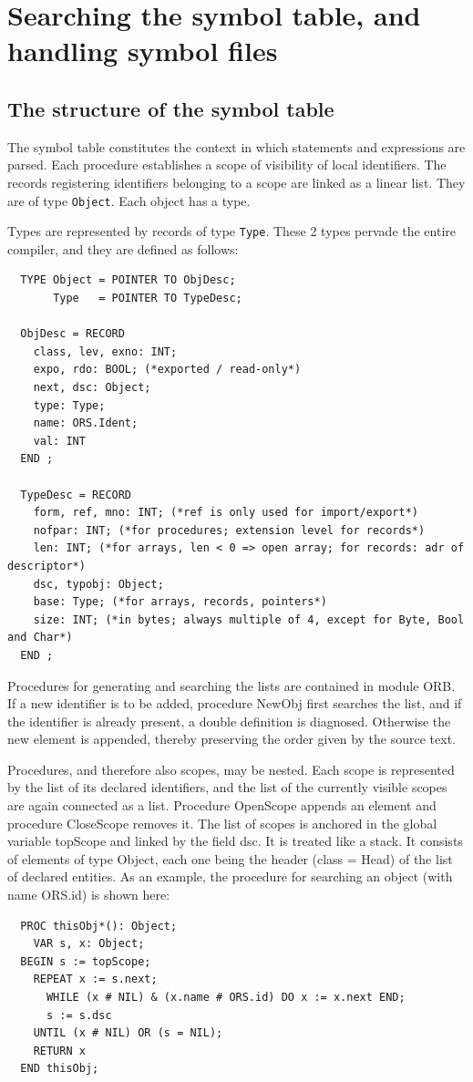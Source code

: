 \section{Searching the symbol table, and handling symbol files}
\subsection{The structure of the symbol table}
The symbol table constitutes the context in which statements and expressions are parsed. Each
procedure establishes a scope of visibility of local identifiers. The records registering identifiers
belonging to a scope are linked as a linear list. They are of type \verb|Object|. Each object has a type.

Types are represented by records of type \verb|Type|. These 2 types pervade the entire compiler, and
they are defined as follows:
\begin{verbatim}
  TYPE Object = POINTER TO ObjDesc;
       Type   = POINTER TO TypeDesc;

  ObjDesc = RECORD
    class, lev, exno: INT;
    expo, rdo: BOOL; (*exported / read-only*)
    next, dsc: Object;
    type: Type;
    name: ORS.Ident;
    val: INT
  END ;

  TypeDesc = RECORD
    form, ref, mno: INT; (*ref is only used for import/export*)
    nofpar: INT; (*for procedures; extension level for records*)
    len: INT; (*for arrays, len < 0 => open array; for records: adr of descriptor*)
    dsc, typobj: Object;
    base: Type; (*for arrays, records, pointers*)
    size: INT; (*in bytes; always multiple of 4, except for Byte, Bool and Char*)
  END ;
\end{verbatim}

Procedures for generating and searching the lists are contained in module ORB. If a new identifier
is to be added, procedure NewObj first searches the list, and if the identifier is already present, a
double definition is diagnosed. Otherwise the new element is appended, thereby preserving the
order given by the source text.

Procedures, and therefore also scopes, may be nested. Each scope is represented by the list of its
declared identifiers, and the list of the currently visible scopes are again connected as a list.
Procedure OpenScope appends an element and procedure CloseScope removes it. The list of
scopes is anchored in the global variable topScope and linked by the field dsc. It is treated like a
stack. It consists of elements of type Object, each one being the header (class = Head) of the list of
declared entities. As an example, the procedure for searching an object (with name ORS.id) is
shown here:
\begin{verbatim}
  PROC thisObj*(): Object;
    VAR s, x: Object;
  BEGIN s := topScope;
    REPEAT x := s.next;
      WHILE (x # NIL) & (x.name # ORS.id) DO x := x.next END;
      s := s.dsc
    UNTIL (x # NIL) OR (s = NIL);
    RETURN x
  END thisObj;
\end{verbatim}

